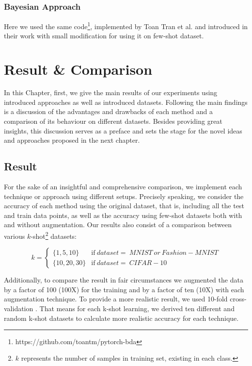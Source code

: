 \subsection{Bayesian Approach}
Here we used the same code\footnote{https://github.com/toantm/pytorch-bda}, implemented by Toan Tran et
al. and introduced in their work \cite{refrence_bayesian_approach} with small modification for using
it on few-shot dataset.


\chapter{Result \& Comparison}
\label{tit:results}
In this Chapter, first, we give the main results of our experiments using introduced approaches as
well as introduced datasets. Following the main findings is a discussion of the advantages and
drawbacks of each method and a comparison of its behaviour on different datasets. Besides providing
great insights, this discussion serves as a preface and sets the stage for the novel ideas and
approaches proposed in the next chapter.

\section{Result}
For the sake of an insightful and comprehensive comparison, we implement each technique or approach
using different setups. Precisely speaking, we consider the accuracy of each method using the
original dataset, that is, including all the test and train data points, as well as the accuracy
using few-shot datasets both with and without augmentation. Our results also consist of a comparison
between various $k$-shot\footnote{$k$ represents the number of samples in training set, existing in
  each class.} datasets:

\begin{equation}
  k=
  \begin{cases}
    \{1, 5, 10\}   & \text{if}\ dataset=
    \ MNIST \ or \ Fashion-MNIST                    \\
    \{10, 20, 30\} & \text{if}\ dataset= \ CIFAR-10
  \end{cases}
\end{equation}

Additionally, to compare the result in fair circumstances we augmented the data by a factor of 100 (100X)
for the training and by a factor of ten (10X) with each augmentation technique. To provide
a more realistic result, we used 10-fold cross-validation \cite{cross_validation}. That means for each k-shot learning, we
derived ten different and random k-shot datasets to calculate more realistic accuracy for each
technique.

